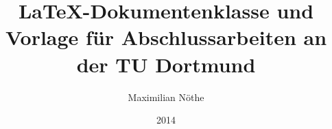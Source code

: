 \documentclass[
  tucolor,
  BCOR=12mm,     %
  parskip=half,  %
  open=any,      %
]{tudothesis}
\author{Maximilian Nöthe}
\title{\LaTeX-Dokumentenklasse und Vorlage für Abschlussarbeiten an der TU Dortmund}
\date{2014}
\begin{document}
\frontmatter
\maketitle

\makecorrectorpage


\tableofcontents

\mainmatter





\appendix


\backmatter
\printbibliography

\cleardoublepage

\end{document}
